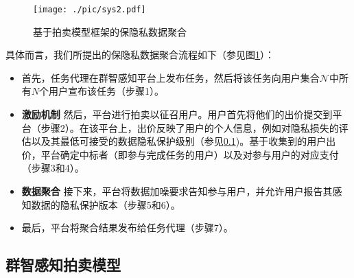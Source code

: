 	\begin{figure}[h!]
		\vspace{-0.0cm}
		\centering
		\texttt{[image: ./pic/sys2.pdf]}
				\vspace{-0.2cm}
		\caption{基于拍卖模型框架的保隐私数据聚合}\label{fg:sys}
		\vspace{-0.3cm}
	\end{figure}
	具体而言，我们所提出的保隐私数据聚合流程如下（参见图\ref{fg:sys}）：
	\begin{itemize}
		\item 首先，任务代理在群智感知平台上发布任务，然后将该任务向用户集合$\mathcal{N}$中所有$N$个用户宣布该任务（步骤1）。
		\item {\bfseries 激励机制} 然后，平台进行拍卖以征召用户。用户首先将他们的出价提交到平台（步骤2）。在该平台上，出价反映了用户的个人信息，例如对隐私损失的评估以及其最低可接受的数据隐私保护级别（参见\ref{sec:pc1})。基于收集到的用户出价，平台确定中标者（即参与完成任务的用户）以及对参与用户的对应支付（步骤3和4）。
		\item {\bfseries 数据聚合} 接下来，平台将数据加噪要求告知参与用户，并允许用户报告其感知数据的隐私保护版本（步骤5和6）。
		\item 最后，平台将聚合结果发布给任务代理（步骤7）。
	\end{itemize}
	
	
	
	\vspace{-0.1cm}
	\subsection{群智感知拍卖模型}\label{sec:pc1}
	
